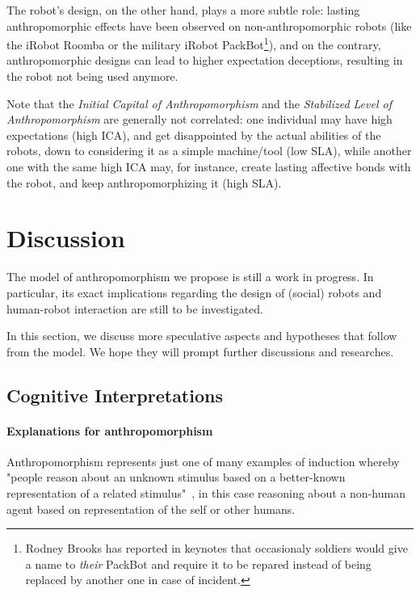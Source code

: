 \documentclass{acm_proc_article-sp}
\begin{document}
The robot's design, on the other hand, plays a more subtle role: lasting
anthropomorphic effects have been observed on non-anthropomorphic robots (like
the iRobot Roomba or the military iRobot PackBot\footnote{Rodney Brooks has
reported in keynotes that occasionaly soldiers would give a name to
\emph{their} PackBot and require it to be repared instead of being replaced by
another one in case of incident.}), and on the contrary, anthropomorphic
designs can lead to higher expectation deceptions, resulting in the robot not
being used anymore.

Note that the \emph{Initial Capital of Anthropomorphism} and the
\emph{Stabilized Level of Anthropomorphism} are generally not correlated: one
individual may have high expectations (high ICA), and get disappointed by the
actual abilities of the robots, down to considering it as a simple machine/tool
(low SLA), while another one with the same high ICA may, for instance, create
lasting affective bonds with the robot, and keep anthropomorphizing it (high
SLA).

\section{Discussion}
\label{sec:discussion}

The model of anthropomorphism we propose is still a work in progress. In
particular, its exact implications regarding the design of (social) robots and
human-robot interaction are still to be investigated.

In this section, we discuss more speculative aspects and hypotheses that follow
from the model. We hope they will prompt further discussions and researches.

\subsection{Cognitive Interpretations}
\label{sec:cognitivemodel}

\paragraph{Explanations for anthropomorphism}

Anthropomorphism represents just one of many examples of induction whereby
"people reason about an unknown stimulus based on a better-known representation
of a related stimulus"~\cite{epley_when_2008}, in this case reasoning about a
non-human agent based on representation of the self or other humans.
\end{document}
